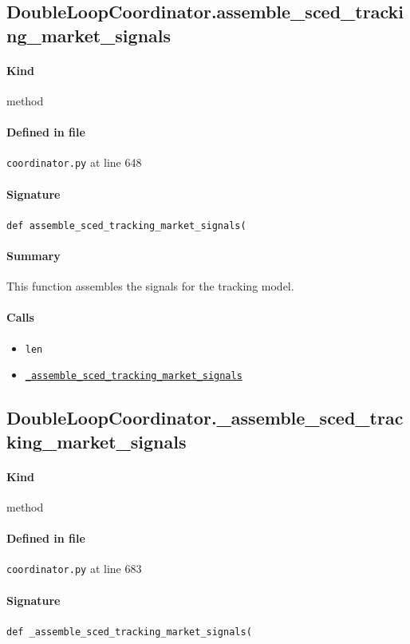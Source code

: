 \documentclass[11pt]{report}
\begin{document}
\subsection{DoubleLoopCoordinator.assemble\_sced\_tracking\_market\_signals}
\label{def:coordinator.py:DoubleLoopCoordinator.assemble_sced_tracking_market_signals:L648}
\paragraph{Kind} method
\paragraph{Defined in file} \texttt{coordinator.py} at line 648
\paragraph{Signature} \texttt{def assemble\_sced\_tracking\_market\_signals(}
\paragraph{Summary} This function assembles the signals for the tracking model.
\paragraph{Calls}
\begin{itemize}[leftmargin=*]
  \item \texttt{len}
  \item \hyperref[def:coordinator.py:DoubleLoopCoordinator._assemble_sced_tracking_market_signals:L683]{\texttt{\_assemble\_sced\_tracking\_market\_signals}}
\end{itemize}
\subsection{DoubleLoopCoordinator.\_assemble\_sced\_tracking\_market\_signals}
\label{def:coordinator.py:DoubleLoopCoordinator._assemble_sced_tracking_market_signals:L683}
\paragraph{Kind} method
\paragraph{Defined in file} \texttt{coordinator.py} at line 683
\paragraph{Signature} \texttt{def \_assemble\_sced\_tracking\_market\_signals(}
\end{document}

